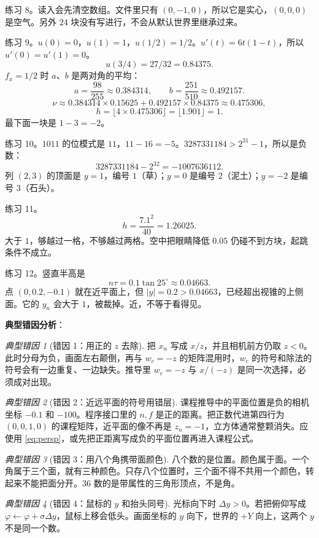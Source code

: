 \documentclass[12pt,a4paper]{article}
\theoremstyle{definition}
\theoremstyle{plain}
\theoremstyle{remark}
\newtheorem*{pitfall}{典型错因}
\begin{document}
练习 8。读入会先清空数组。文件里只有 \((0,-1,0)\)，所以它是实心，\((0,0,0)\) 是空气。另外 \(24\) 块没有写进行，不会从默认世界里继承过来。

练习 9。\(u(0)=0\)，\(u(1)=1\)，\(u(1/2)=1/2\)。\(u'(t)=6t(1-t)\)，所以 \(u'(0)=u'(1)=0\)。
\[
u(3/4)=27/32=0.84375.
\]
\(f_x=1/2\) 时 \(a\)、\(b\) 是两对角的平均：
\[
a=\frac{98}{255}\approx 0.384314,\qquad
b=\frac{251}{510}\approx 0.492157.
\]
\[
\nu\approx 0.384314\times 0.15625+0.492157\times 0.84375\approx 0.475306,
\]
\[
h=\lfloor 4\times 0.475306\rfloor=\lfloor 1.901\rfloor=1.
\]
最下面一块是 \(1-3=-2\)。

练习 10。\(1011\) 的位模式是 \(11\)，\(11-16=-5\)。\(3287331184>2^{31}-1\)，所以是负数：
\[
3287331184-2^{32}=-1007636112.
\]
列 \((2,3)\) 的顶面是 \(y=1\)，编号 \(1\)（草）；\(y=0\) 是编号 \(2\)（泥土）；\(y=-2\) 是编号 \(3\)（石头）。

练习 11。
\[
h=\frac{7.1^2}{40}=1.26025.
\]
大于 \(1\)，够越过一格，不够越过两格。空中把眼睛降低 \(0.05\) 仍碰不到方块，起跳条件不成立。

练习 12。竖直半高是
\[
n\tau=0.1\tan 25^\circ\approx 0.04663.
\]
点 $(0,0.2,-0.1)$ 就在近平面上，但 $|y|=0.2>0.04663$，已经超出视锥的上侧面。它的 $y_n$ 会大于 $1$，被裁掉。近，不等于看得见。

\textbf{典型错因分析}：

\begin{pitfall}[错因 1：用正的 $z$ 去除]
把 $x_n$ 写成 $x/z$，并且相机前方仍取 $z<0$。此时分母为负，画面左右颠倒，再与 $w_c=-z$ 的矩阵混用时，$w_c$ 的符号和除法的符号会有一边重复、一边缺失。推导里 $w_c=-z$ 与 $x/(-z)$ 是同一次选择，必须成对出现。
\end{pitfall}

\begin{pitfall}[错因 2：近远平面的符号用错层]
课程推导中的平面位置是负的相机坐标 $-0.1$ 和 $-100$。程序接口里的 $n,f$ 是正的距离。把正数代进第四行为 $(0,0,1,0)$ 的课程矩阵，近平面的像不再是 $z_n=-1$，立方体通常整颗消失。应使用 \eqref{eq:persp}，或先把正距离写成负的平面位置再进入课程公式。
\end{pitfall}

\begin{pitfall}[错因 3：用八个角携带面颜色]
八个数的是位置。颜色属于面。一个角属于三个面，就有三种颜色。只存八个位置时，三个面不得不共用一个颜色，转起来不能把面分开。$36$ 数的是带属性的三角形顶点，不是角。
\end{pitfall}

\begin{pitfall}[错因 4：鼠标的 $y$ 和抬头同号]
光标向下时 $\Delta y>0$。若把俯仰写成 $\varphi\leftarrow\varphi+\sigma\Delta y$，鼠标上移会低头。画面坐标的 $y$ 向下，世界的 $+Y$ 向上，这两个 $y$ 不是同一个数。
\end{pitfall}
\end{document}
